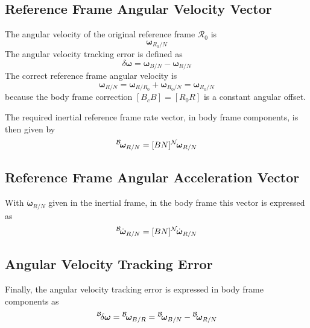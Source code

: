 \subsection{Reference Frame Angular Velocity Vector}
The angular velocity of the original reference frame $\mathcal{R}_{0}$ is
\begin{equation}
	\bm\omega_{R_{0}/N}
\end{equation}
The angular velocity tracking error is defined as
\begin{equation}
	\delta\bm\omega = \bm\omega_{B/N} - \bm\omega_{R/N}
\end{equation}
The correct reference frame angular velocity is
\begin{equation}
	\bm\omega_{R/N} = \bm\omega_{R/R_{0}} + \bm\omega_{R_{0}/N} =  \bm\omega_{R_{0}/N} 
\end{equation}
because the body frame correction $[B_{c} B] = [R_{0}R]$ is a constant angular offset.  

The required inertial reference frame rate vector, in body frame components, is then given by
\begin{equation}
	\leftexp{B}{\bm\omega}_{R/N} = [BN] \leftexp{N}{\bm\omega}_{R/N}
\end{equation}


\subsection{Reference Frame Angular Acceleration Vector}
With $\dot{\bm \omega}_{R/N}$ given in the inertial frame, in the body frame this vector is expressed as
\begin{equation}
	\leftexp{B}{\dot{\bm\omega}}_{R/N} = [BN] \leftexp{N}{\dot{\bm\omega}}_{R/N}
\end{equation}


\subsection{Angular Velocity Tracking Error}
Finally, the angular velocity tracking error is expressed in body frame components as
\begin{equation}
	\leftexp{B}{\delta\bm\omega} = \leftexp{B}{\bm\omega_{B/R}} = \leftexp{B}{\bm\omega}_{B/N} - \leftexp{B}{\bm\omega}_{R/N}
\end{equation}
